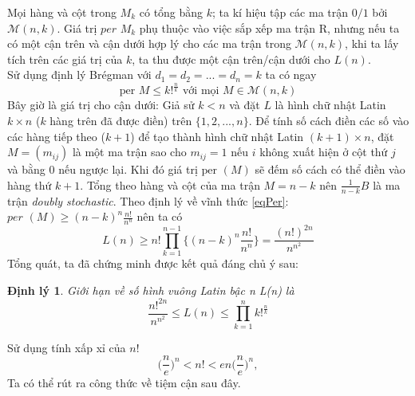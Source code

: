 \documentclass[a4paper, 12pt]{report}
\newtheorem*{theorem}{Định lý } %
\begin{document}
Mọi hàng và cột trong $M_k$ có tổng bằng $k$; ta kí hiệu tập các ma trận $0/1$ bởi $\mathcal{M}(n,k)$. Giá trị $per$ $M_k$ phụ thuộc vào việc sắp xếp ma trận R, nhưng nếu ta có một cận trên và cận dưới hợp lý cho các ma trận trong $\mathcal{M}(n,k)$, khi ta lấy tích trên các giá trị của $k$, ta thu được một cận trên/cận dưới cho $L(n)$.\\
Sử dụng định lý Brégman với $d_1=d_2=...=d_n=k$ ta có ngay
\begin{equation*}
	\textrm{per } M \leq k!^{\frac{n}{k}}		 \textrm{								với mọi      }M \in \mathcal{M}(n,k)
\end{equation*}
Bây giờ là giá trị cho cận dưới: Giả sử $k<n$ và đặt $L$ là hình chữ nhật Latin $k \times n$ ($k$ hàng trên đã được điền) trên $\{1,2,...,n\}$. Để tính số cách điền các số vào các hàng tiếp theo ($k+1$) để tạo thành hình chữ nhật Latin $(k+1) \times n$, đặt $M=(m_{ij})$ là một ma trận sao cho $m_{ij} = 1$ nếu $i$ không xuất hiện ở cột thứ $j$ và bằng $0$ nếu ngược lại. Khi đó giá trị $\textrm{per }(M)$ sẽ đếm số cách có thể điền vào hàng thứ $k+1$. Tổng theo hàng và cột của ma trận $M = n-k$ nên $\frac{1}{n-k}B$ là ma trận \textit{doubly stochastic}. Theo định lý về vĩnh thức \eqref{eqPer}: $\textit{per }(M) \geq (n-k)^n\frac{n!}{n^n}$ nên ta có
\begin{equation*}
	L(n) \geq n! \displaystyle\prod_{k=1}^{n-1}\{ (n-k)^{n}\frac{n!}{n^n} \} = \frac{(n!)^{2n}}{n^{n^2}} 
\end{equation*}
Tổng quát, ta đã chứng minh được kết quả đáng chủ ý sau:
\begin{theorem}
	Giới hạn về số hình vuông Latin bậc n L(n) là
	\begin{equation*}
		\frac{n!^{2n}}{n^{n^2}} \leq L(n) \leq \displaystyle \prod_{k=1}^{n} k!^{\frac{n}{k}}
	\end{equation*}
\end{theorem}

Sử dụng tính xấp xỉ của $n!$
\begin{equation}
	\Big( \frac{n}{e} \Big)^n < n! < en\Big(\frac{n}{e} \Big)^n,
\end{equation}
Ta có thể rút ra công thức về tiệm cận sau đây.
\end{document}
